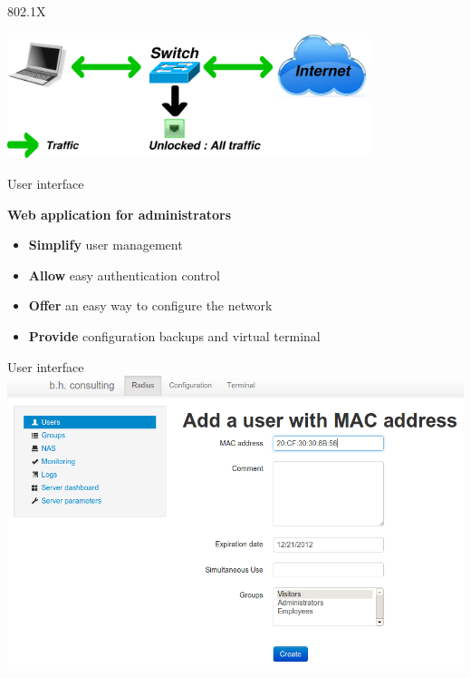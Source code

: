 \documentclass[12pt]{beamer}
\begin{document}
\begin{frame}{802.1X}
\vfill
\begin{center}
    \includegraphics[width=300pt]{img/dot1x_7.pdf}
\end{center}
\vfill
\end{frame}

\begin{frame}{User interface}
    \begin{center}
    \textbf{Web application for administrators}
    \end{center}

    \pause
    \begin{itemize}[<+->]\vfill
	\item \textbf{Simplify} user management\vfill
	\item \textbf{Allow} easy authentication control\vfill
	\item \textbf{Offer} an easy way to configure the network\vfill
    	\item \textbf{Provide} configuration backups and virtual terminal\vfill
    \end{itemize}
    \vfill
\end{frame}
	
\begin{frame}{User interface}
    \includegraphics[width=\textwidth]{img/capture4.png}
\end{frame}
\end{document}
